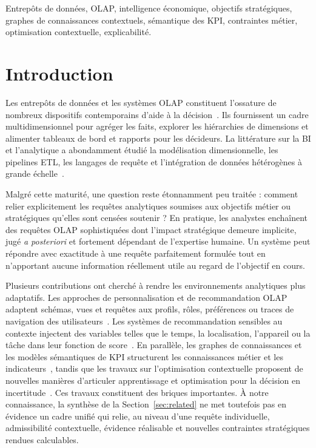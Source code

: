 \documentclass[journal]{IEEEtran}
\begin{document}
\begin{IEEEkeywords}
Entrepôts de données, OLAP, intelligence économique, objectifs stratégiques, graphes de connaissances contextuels, sémantique des KPI, contraintes métier, optimisation contextuelle, explicabilité.
\end{IEEEkeywords}

\section{Introduction}
\label{sec:intro}

Les entrepôts de données et les systèmes OLAP constituent l'ossature de nombreux dispositifs contemporains d'aide à la décision~\cite{ChaudhuriDayal97,KimballRoss2013,ChenBI2012}. Ils fournissent un cadre multidimensionnel pour agréger les faits, explorer les hiérarchies de dimensions et alimenter tableaux de bord et rapports pour les décideurs. La littérature sur la BI et l'analytique a abondamment étudié la modélisation dimensionnelle, les pipelines ETL, les langages de requête et l'intégration de données hétérogènes à grande échelle~\cite{ChaudhuriDayal97,KimballRoss2013,ChenBI2012}.

Malgré cette maturité, une question reste étonnamment peu traitée : comment relier explicitement les requêtes analytiques soumises aux objectifs métier ou stratégiques qu'elles sont censées soutenir ? En pratique, les analystes enchaînent des requêtes OLAP sophistiquées dont l'impact stratégique demeure implicite, jugé \emph{a posteriori} et fortement dépendant de l'expertise humaine. Un système peut répondre avec exactitude à une requête parfaitement formulée tout en n'apportant aucune information réellement utile au regard de l'objectif en cours.

Plusieurs contributions ont cherché à rendre les environnements analytiques plus adaptatifs. Les approches de personnalisation et de recommandation OLAP adaptent schémas, vues et requêtes aux profils, rôles, préférences ou traces de navigation des utilisateurs~\cite{AissiGouider2012,GarrigosER2009,AligonDSS2015}. Les systèmes de recommandation sensibles au contexte injectent des variables telles que le temps, la localisation, l'appareil ou la tâche dans leur fonction de score~\cite{RoyContextOLAP2022,AdomaviciusTuzhilin2011}. En parallèle, les graphes de connaissances et les modèles sémantiques de KPI structurent les connaissances métier et les indicateurs~\cite{HoganKGSurvey2021,DiamantiniKPISurvey2025,Niedritis2011,RomeroAbello2010}, tandis que les travaux sur l'optimisation contextuelle proposent de nouvelles manières d'articuler apprentissage et optimisation pour la décision en incertitude~\cite{SadanaEJOR2025}. Ces travaux constituent des briques importantes. À notre connaissance, la synthèse de la Section~\ref{sec:related} ne met toutefois pas en évidence un cadre unifié qui relie, au niveau d'une requête individuelle, admissibilité contextuelle, évidence réalisable et nouvelles contraintes stratégiques rendues calculables.
\end{document}
